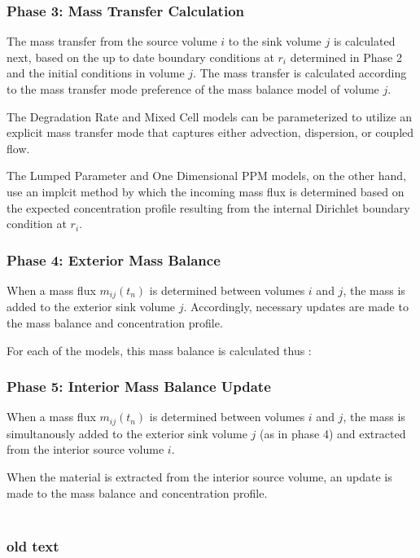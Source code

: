 \subsubsection{Phase 3: Mass Transfer Calculation}

The mass transfer from the source volume $i$ to the sink volume $j$ is 
calculated next, based on the up to date boundary conditions at $r_i$ 
determined in Phase 2 and the initial conditions in volume $j$. The mass 
transfer is calculated according to the mass transfer mode preference of the 
mass balance model of volume $j$.  

The Degradation Rate and Mixed Cell models can be parameterized to utilize an 
explicit mass transfer mode that captures either advection, dispersion, or coupled flow. 

The Lumped Parameter and One Dimensional PPM models, on the other hand, use an 
implcit method by which the incoming mass flux is determined based on the 
expected concentration profile resulting from the internal 
Dirichlet boundary condition at $r_i$. 

\subsubsection{Phase 4: Exterior Mass Balance}

When a mass flux $m_{ij}(t_n)$ is determined between volumes $i$ and $j$, the 
mass is added to the exterior sink volume $j$. Accordingly, necessary updates 
are made to the mass balance and concentration profile. 

For each of the models, this mass balance is calculated thus :



\subsubsection{Phase 5: Interior Mass Balance Update}
When a mass flux $m_{ij}(t_n)$ is determined between volumes $i$ and $j$, the 
mass is simultanously added to the exterior sink volume $j$ (as in phase 4) and 
extracted from the interior source volume $i$.

When the material is extracted from the interior source volume, an update is 
made to the mass balance and concentration profile.

\begin{align}
\end{align}

\subsubsection{old text}

